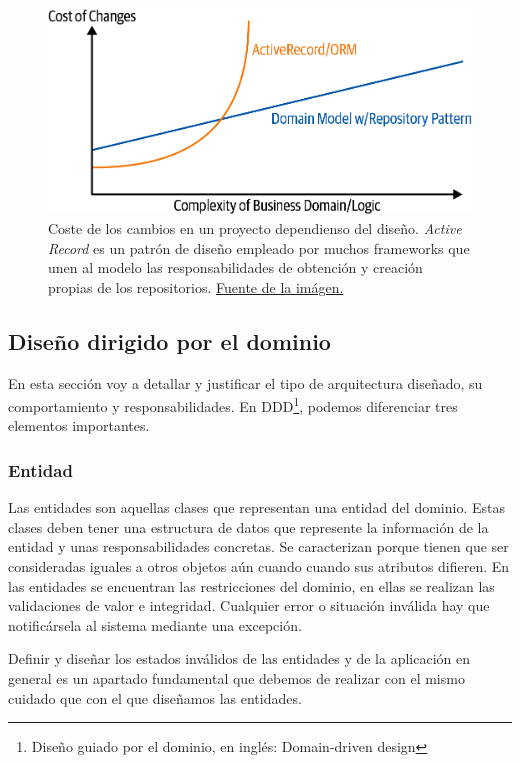 \FloatBarrier
\begin{figure}[h]
	\centering	
	\includegraphics[width=\textwidth]{doc/logos/imgs/costeEvolucion.png}
    \caption{Coste de los cambios en un proyecto dependienso del diseño. \textit{Active Record} es un 
    patrón de diseño empleado por muchos frameworks que unen al modelo las responsabilidades de 
    obtención y creación propias de los repositorios. \href{https://www.cosmicpython.com/book/images/apwp_0205.png}{Fuente de la imágen.}}
    \label{fig:coste-repo-pattern}
\end{figure}
\FloatBarrier


\subsection{Diseño dirigido por el dominio}
En esta sección voy a detallar y justificar el tipo de arquitectura diseñado, su
comportamiento y responsabilidades. En DDD\footnote{Diseño guiado por el dominio, en
inglés: Domain-driven design}, podemos diferenciar tres elementos importantes.

\subsubsection{Entidad}
Las entidades son aquellas clases que representan una entidad del dominio. Estas clases
deben tener una estructura de datos que represente la información de la entidad y unas
responsabilidades concretas. Se caracterizan porque tienen que ser consideradas iguales a
otros objetos aún cuando cuando sus atributos difieren. En las entidades se encuentran las
restricciones del dominio, en ellas se realizan las validaciones de valor e integridad.
Cualquier error o situación inválida hay que notificársela al sistema mediante una
excepción. 

Definir y diseñar los estados inválidos de las entidades y de la aplicación en general es
un apartado fundamental que debemos de realizar con el mismo cuidado que con el que
diseñamos las entidades.

